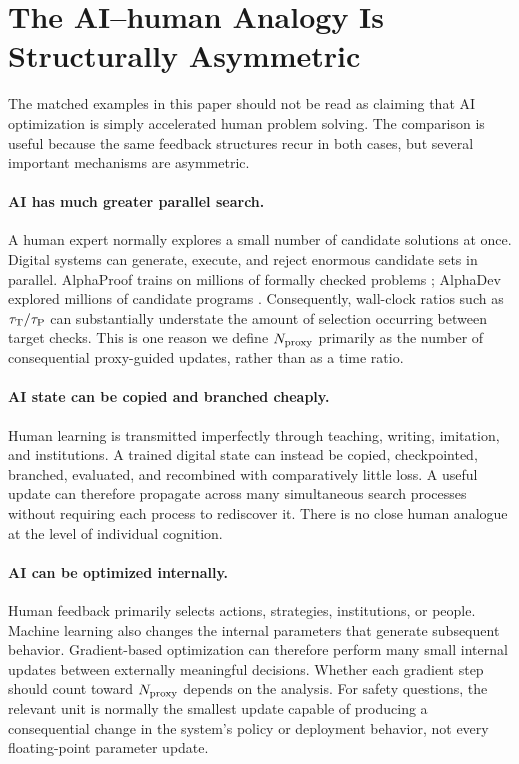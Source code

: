 \section{The AI--human Analogy Is Structurally Asymmetric}
\label{sec:asymmetries}

The matched examples in this paper should not be read as claiming that AI optimization
is simply accelerated human problem solving.  The comparison is useful because the
same feedback structures recur in both cases, but several important mechanisms are
asymmetric.

\paragraph{AI has much greater parallel search.}
A human expert normally explores a small number of candidate solutions at once.
Digital systems can generate, execute, and reject enormous candidate sets in parallel.
AlphaProof trains on millions of formally checked problems
\parencite{hubert2025alphaproof}; AlphaDev explored millions of candidate programs
\parencite{mankowitz2023alphadev}.  Consequently, wall-clock ratios such as
\(\tau_{\mathrm{T}}/\tau_{\mathrm{P}}\) can substantially understate the amount of selection occurring
between target checks.  This is one reason we define \(N_{\mathrm{proxy}}\) primarily as the number of
consequential proxy-guided updates, rather than as a time ratio.

\paragraph{AI state can be copied and branched cheaply.}
Human learning is transmitted imperfectly through teaching, writing, imitation, and
institutions.  A trained digital state can instead be copied, checkpointed, branched,
evaluated, and recombined with comparatively little loss.  A useful update can
therefore propagate across many simultaneous search processes without requiring each
process to rediscover it.  There is no close human analogue at the level of individual
cognition.

\paragraph{AI can be optimized internally.}
Human feedback primarily selects actions, strategies, institutions, or people.
Machine learning also changes the internal parameters that generate subsequent
behavior.  Gradient-based optimization can therefore perform many small internal
updates between externally meaningful decisions.  Whether each gradient step should
count toward \(N_{\mathrm{proxy}}\) depends on the analysis.  For safety questions, the relevant unit
is normally the smallest update capable of producing a consequential change in the
system's policy or deployment behavior, not every floating-point parameter update.

